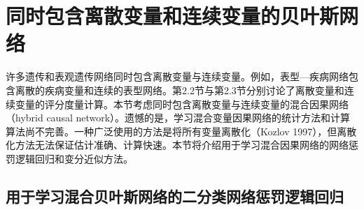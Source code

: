 \section{同时包含离散变量和连续变量的贝叶斯网络}
\label{sec:ch02-hybrid}

许多遗传和表观遗传网络同时包含离散变量与连续变量。例如，表型—疾病网络包含离散的疾病变量和连续的表型网络。第2.2节与第2.3节分别讨论了离散变量和连续变量的评分度量计算。本节考虑同时包含离散变量与连续变量的混合因果网络（hybrid causal network）。遗憾的是，学习混合变量因果网络的统计方法和计算算法尚不完善。一种广泛使用的方法是将所有变量离散化（Kozlov 1997），但离散化方法无法保证估计准确、计算快速。本节将介绍用于学习混合因果网络的网络惩罚逻辑回归和变分近似方法。

\subsection{用于学习混合贝叶斯网络的二分类网络惩罚逻辑回归}

